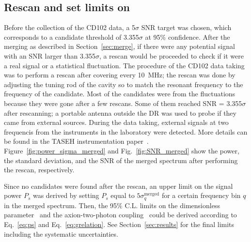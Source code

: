 \subsection{Rescan and set limits on \gagg} 
Before the collection of the CD102 data, a 5$\sigma$ SNR target was chosen, 
which corresponds to a candidate threshold of 3.355$\sigma$ at 95\% confidence.
 After the merging as described in Section~\ref{sec:merge}, if there were 
any potential signal with an SNR larger than 
3.355$\sigma$, a rescan would be proceeded to check if it were a real signal or 
a statistical fluctuation. 
The procedure of the CD102 data taking was to perform a rescan after 
covering every 10~MHz; the rescan was done by adjusting the tuning rod of the 
cavity so to match the resonant frequency to the frequency of the candidate. 
Most of the candidates were from the fluctuations because they were gone 
after a few rescans. 
Some of them reached SNR = 3.355$\sigma$ after rescanning; a portable 
antenna outside the DR was used to probe if they came from external sources. 
During the data taking, external signals at two frequencis from the instruments
in the laboratory were detected. More details can be found in the 
TASEH instrumentation paper~\cite{TASEHInstrumentation}. 
Figure~\ref{fig:power_sigma_merged} and Fig.~\ref{fig:SNR_merged} show the 
power, the standard deviation, and the SNR of the merged spectrum after 
performing the rescan, respectively. 

Since no candidates were found after the rescan, an upper limit on 
the signal power $P_s$ was derived by setting $P_s$ equal to 
$5\sigma_{q}^\text{merged}$ for a certain frequency bin $q$ in the merged 
spectrum.  Then, the 95\% C.L. limits on the dimensionless parameter 
\ggamma\ and the axion-two-photon coupling \gagg\ could be derived 
according to Eq.~\eqref{eq:ps} and Eq.~\eqref{eq:grelation}. 
See Section~\ref{sec:results} for the final limits including the systematic 
uncertainties.

